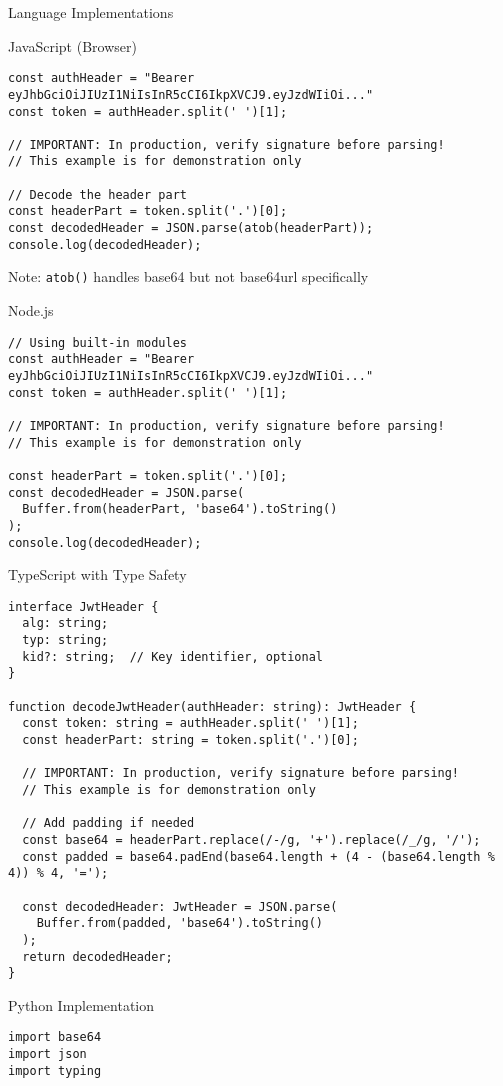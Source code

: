 \documentclass[presentation,aspectratio=169]{beamer}
\begin{document}
\begin{frame}[label={sec:orgcc55a06},fragile]{Language Implementations}
 \begin{block}{JavaScript (Browser) 🧩}
\begin{verbatim}
const authHeader = "Bearer eyJhbGciOiJIUzI1NiIsInR5cCI6IkpXVCJ9.eyJzdWIiOi..."
const token = authHeader.split(' ')[1];

// IMPORTANT: In production, verify signature before parsing!
// This example is for demonstration only

// Decode the header part
const headerPart = token.split('.')[0];
const decodedHeader = JSON.parse(atob(headerPart));
console.log(decodedHeader);
\end{verbatim}

\alert{Note}: \texttt{atob()} handles base64 but not base64url specifically
\end{block}
\begin{block}{Node.js 🧩}
\begin{verbatim}
// Using built-in modules
const authHeader = "Bearer eyJhbGciOiJIUzI1NiIsInR5cCI6IkpXVCJ9.eyJzdWIiOi..."
const token = authHeader.split(' ')[1];

// IMPORTANT: In production, verify signature before parsing!
// This example is for demonstration only

const headerPart = token.split('.')[0];
const decodedHeader = JSON.parse(
  Buffer.from(headerPart, 'base64').toString()
);
console.log(decodedHeader);
\end{verbatim}
\end{block}
\begin{block}{TypeScript with Type Safety 🧩}
\begin{verbatim}
interface JwtHeader {
  alg: string;
  typ: string;
  kid?: string;  // Key identifier, optional
}

function decodeJwtHeader(authHeader: string): JwtHeader {
  const token: string = authHeader.split(' ')[1];
  const headerPart: string = token.split('.')[0];

  // IMPORTANT: In production, verify signature before parsing!
  // This example is for demonstration only

  // Add padding if needed
  const base64 = headerPart.replace(/-/g, '+').replace(/_/g, '/');
  const padded = base64.padEnd(base64.length + (4 - (base64.length % 4)) % 4, '=');

  const decodedHeader: JwtHeader = JSON.parse(
    Buffer.from(padded, 'base64').toString()
  );
  return decodedHeader;
}
\end{verbatim}
\end{block}
\begin{block}{Python Implementation 🧩}
\begin{verbatim}
import base64
import json
import typing


\end{verbatim}
\end{block}
\end{frame}
\end{document}
